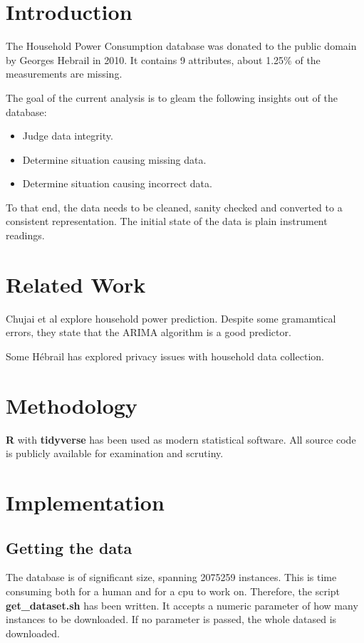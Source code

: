 \documentclass[11pt]{article}
\title{\MakeMeBlue{Data reliability for the Household Power Consumption Dataset}}
\author{Miroslav Vitkov}
\date{\today}
\newcommand{\code}[1]{\textbf{#1}}
\newcommand{\para}[0]{\par\vspace{0.5cm}}
\begin{document}
\maketitle

\section{Introduction}
The Household Power Consumption database was donated to the public domain by Georges Hebrail in 2010.
It contains 9 attributes, about 1.25\% of the measurements are missing.
\para
The goal of the current analysis is to gleam the following insights out of the database:
\begin{itemize}
    \item{Judge data integrity.}
    \item{Determine situation causing missing data.}
    \item{Determine situation causing incorrect data.}
\end{itemize}
\para
To that end, the data needs to be cleaned, sanity checked and converted to a consistent representation.
The initial state of the data is plain instrument readings.

\section{Related Work}
Chujai et al\cite{q1} explore household power prediction.
Despite some gramamtical errors, they state that the ARIMA algorithm is a good predictor.
\para 
Some Hébrail has explored privacy issues with household data collection\cite{q2}.
\section{Methodology}
\code{R} with \code{tidyverse} has been used as modern statistical software.
All source code is publicly available for examination and scrutiny.

\section{Implementation}
\subsection{Getting the data}
The database is of significant size, spanning 2075259 instances.
This is time consuming both for a human and for a cpu to work on.
Therefore, the script \code{get\_dataset.sh} has been written.
It accepts a numeric parameter of how many instances to be downloaded.
If no parameter is passed, the whole datased is downloaded.
\end{document}
